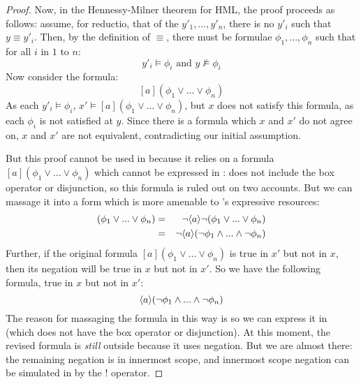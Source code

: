 \begin{proof}
Now, in the Hennessy-Milner theorem for HML, the proof proceeds as follows:
assume, for reductio, that of the $y'_1, ..., y'_n$, there is no $y'_i$ such that $y \equiv y'_i$.
Then, by the definition of $\equiv$, there must be formulae $\phi_1, ..., \phi_n$ such that for all $i$ in $1$ to $n$:
\[
y'_i \models \phi_i \mbox{ and } y \nvDash \phi_i
\]
Now consider the formula:
\[
[a] (\phi_1 \lor ... \lor \phi_n)
\]
As each $y'_i \models \phi_i$, $x' \models [a] (\phi_1 \lor ... \lor \phi_n)$, but $x$ does not satisfy this formula, as each $\phi_i$ is not satisfied at $y$.
Since there is a formula which $x$ and $x'$ do not agree on, $x$ and $x'$ are not equivalent, contradicting our initial assumption.

But this proof cannot be used in \ELABR{} because it relies on a formula $[a] (\phi_1 \lor ... \lor \phi_n)$ which cannot be expressed in \ELABR{}: 
\ELABR{} does not include the box operator or disjunction, so this formula is ruled out on two accounts.
But we can massage it into a form which is more amenable to \ELABR{}'s expressive resources:
\begin{eqnarray*}
[a] (\phi_1 \lor ... \lor \phi_n) & = & \neg \langle a \rangle \neg (\phi_1 \lor ... \lor \phi_n)  \\
	& = & \neg \langle a \rangle (\neg \phi_1\AND ... \AND \neg \phi_n) 
\end{eqnarray*}
Further, if the original formula $[a] (\phi_1 \lor ... \lor \phi_n)$ is true in $x'$ but not in $x$, then its negation will be true in $x$ but not in $x'$. 
So we have the following formula, true in $x$ but not in $x'$:
\[
 \langle a \rangle (\neg \phi_1\land ... \land \neg \phi_n)
 \]
The reason for massaging the formula in this way is so we can express it in \ELABR{} (which does not have the box operator or disjunction).
At this moment, the revised formula is \emph{still} outside \ELABR{} because it uses negation. 
But we are almost there: the remaining negation is in innermost scope, and innermost scope negation can be simulated in \ELABR{} by the $!$ operator. 


\end{proof}
